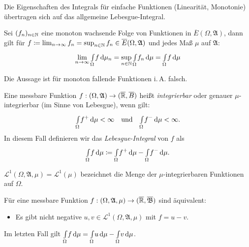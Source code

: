 \documentclass{cheat-sheet}
\newcommand{\ER}{\overline\R} %
\newcommand{\Alg}{\mathfrak{A}}
\newcommand{\Bor}{\mathfrak{B}} %
\newcommand{\Leb}{\mathcal{L}} %
\newcommand{\IntOmu}[1]{\Int{\Omega}{}{#1}{\mu}}
\begin{document}
\begin{satz}
  Die Eigenschaften des Integrals für einfache Funktionen (Linearität, Monotonie) übertragen sich auf das allgemeine Lebesgue-Integral.
\end{satz}

\begin{satz}
  Sei $(f_n)_{n \in \mathbb{N}}$ eine monoton wachsende Folge von Funktionen in $\overline{E}(\Omega, \Alg)$, dann gilt für $f \coloneqq \lim_{n \to \infty} f_n = \sup_{n \in \N} f_n \in \overline{E}(\Omega, \Alg)$ und jedes Maß $\mu$ auf $\Alg$:
  \[ \lim_{n \to \infty} \IntOmu f_n = \sup_{n \in \N} \IntOmu{f_n} = \IntOmu{f} \]
\end{satz}

\begin{bem}
  Die Aussage ist für monoton fallende Funktionen i.\,A. falsch.
\end{bem}

\begin{defn}
  Eine messbare Funktion $f : (\Omega, \Alg) \to (\ER, \overline{B})$ heißt \emph{integrierbar} oder genauer $\mu$-integrierbar (im Sinne von Lebesgue), wenn gilt:
  \[ \IntOmu{f^+} < \infty \quad \text{und} \quad \IntOmu{f^-} < \infty. \]
  In diesem Fall definieren wir das \emph{Lebesgue-Integral} von $f$ als
  \[ \IntOmu{f} \coloneqq \IntOmu{f^+} - \IntOmu{f^-}. \]
\end{defn}

\begin{nota}
  $\Leb^1(\Omega, \Alg, \mu) = \Leb^1(\mu)$ bezeichnet die Menge der $\mu$-integrierbaren Funktionen auf $\Omega$.
\end{nota}

\begin{satz}
  Für eine messbare Funktion $f : (\Omega, \Alg, \mu) \to (\ER, \overline{\Bor})$ sind äquivalent:
  \begin{itemize}
    \item Es gibt nicht negative $u, v \in \Leb^1(\Omega, \Alg, \mu)$ mit $f = u - v$.
  \end{itemize}
  Im letzten Fall gilt $\IntOmu{f} = \IntOmu{u} - \IntOmu{v}$.
\end{satz}
\end{document}
